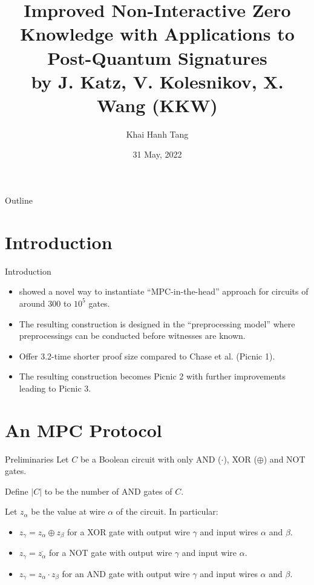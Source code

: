 \documentclass{beamer}
\title{Improved Non-Interactive Zero Knowledge with Applications to Post-Quantum Signatures\\ by  J. Katz, V. Kolesnikov, X. Wang (KKW)}
\author{Khai Hanh Tang}
\date{31 May, 2022}
\begin{document}
	
	\begin{frame}
		\titlepage
	\end{frame}
	
	\begin{frame}{Outline}
		\tableofcontents
		
	\end{frame}
	
	\section{Introduction}
	\begin{frame}{Introduction}
		\begin{itemize}
			\item \cite{KatzK018} showed a novel way to instantiate ``MPC-in-the-head'' approach \cite{IshaiKOS07} for circuits of around $300$ to $10^5$ gates.
			
			\item The resulting construction is designed in the ``preprocessing model'' where preprocessings can be conducted before witnesses are known.
			
			\item Offer 3.2-time shorter proof size compared to Chase et al. \cite{ChaseDGORRSZ17} (Picnic 1).
			
			\item The resulting construction becomes Picnic 2 with further improvements \cite{KalesZ20} leading to Picnic 3.
		\end{itemize}
	\end{frame}
	
	\section{An MPC Protocol}
	\begin{frame}{Preliminaries}
		Let $C$ be a Boolean circuit with only AND ($\cdot$), XOR ($\oplus$) and NOT gates. 
		
		Define $\vert C \vert$ to be the number of AND gates of $C$.
		
		Let $z_\alpha$ be the value at wire $\alpha$ of the circuit. In particular:
		\begin{itemize}
			\item $z_\gamma = z_\alpha \oplus z_\beta$ for a XOR gate with output wire $\gamma$ and input wires $\alpha$ and $\beta$.
			\item $z_\gamma = \overline{z_\alpha}$ for a NOT gate with output wire $\gamma$ and input wire $\alpha$.
			\item $z_\gamma = z_\alpha \cdot z_\beta$ for an AND gate with output wire $\gamma$ and input wires $\alpha$ and $\beta$.
		\end{itemize}
	\end{frame}
\end{document}
